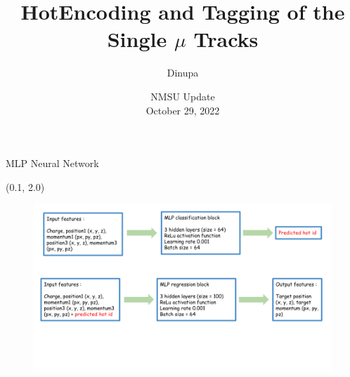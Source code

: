 \documentclass[12pt, xcolor={dvipsnames}, aspectratio = 169]{beamer}
\title{HotEncoding and Tagging of the Single $\mu$ Tracks}
\author{Dinupa}
\date{NMSU Update
\\ October 29, 2022 }
\begin{document}
\begin{frame}
    \maketitle
\end{frame}


\begin{frame}{MLP Neural Network}
\begin{textblock}{14.0}(0.1, 2.0)
    \begin{figure}
        \centering
        \includegraphics[width=14.0cm]{../imgs/flow-chart.png}
    \end{figure}
\end{textblock}
\end{frame}
\end{document}
